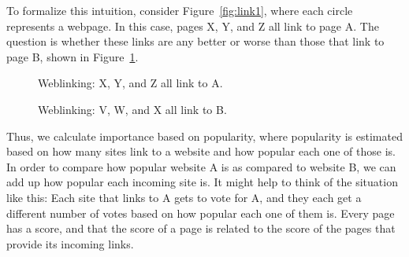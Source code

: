 To formalize this intuition, consider Figure~\ref{fig:link1}, where each circle represents a webpage.  In this case, pages X, Y, and
Z all link to page A.   The question is whether these links are any
better or worse than those that link to page B, shown in
Figure~\ref{fig:link3}.

\begin{figure}
\captionsetup{margin=.05\linewidth}
\begin{floatrow}
    {\caption{Weblinking: X, Y, and Z all link to A.}\label{fig:link1}}
    {\caption{Weblinking: V, W, and X all link to B.}\label{fig:link3}}
    \end{floatrow}
\end{figure}


Thus, we calculate importance based on popularity, where popularity is estimated based on how many sites link to a website and how popular each one of those is.  In order to compare how popular website A is as compared to website B, we can add up how popular each incoming site is.  It might help to think of the situation like this: Each site that links to A gets to vote for A, and they each get a different number of votes based on how popular each one of them is.   Every page has a score, and that the score of a page is related to the score of the pages that provide its incoming links.

